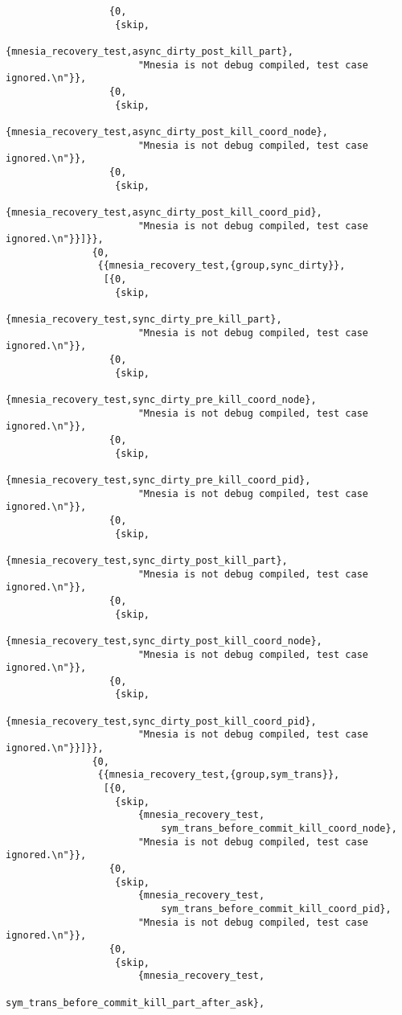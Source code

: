 \begin{verbatim}
                  {0,
                   {skip,
                       {mnesia_recovery_test,async_dirty_post_kill_part},
                       "Mnesia is not debug compiled, test case ignored.\n"}},
                  {0,
                   {skip,
                       {mnesia_recovery_test,async_dirty_post_kill_coord_node},
                       "Mnesia is not debug compiled, test case ignored.\n"}},
                  {0,
                   {skip,
                       {mnesia_recovery_test,async_dirty_post_kill_coord_pid},
                       "Mnesia is not debug compiled, test case ignored.\n"}}]}},
               {0,
                {{mnesia_recovery_test,{group,sync_dirty}},
                 [{0,
                   {skip,
                       {mnesia_recovery_test,sync_dirty_pre_kill_part},
                       "Mnesia is not debug compiled, test case ignored.\n"}},
                  {0,
                   {skip,
                       {mnesia_recovery_test,sync_dirty_pre_kill_coord_node},
                       "Mnesia is not debug compiled, test case ignored.\n"}},
                  {0,
                   {skip,
                       {mnesia_recovery_test,sync_dirty_pre_kill_coord_pid},
                       "Mnesia is not debug compiled, test case ignored.\n"}},
                  {0,
                   {skip,
                       {mnesia_recovery_test,sync_dirty_post_kill_part},
                       "Mnesia is not debug compiled, test case ignored.\n"}},
                  {0,
                   {skip,
                       {mnesia_recovery_test,sync_dirty_post_kill_coord_node},
                       "Mnesia is not debug compiled, test case ignored.\n"}},
                  {0,
                   {skip,
                       {mnesia_recovery_test,sync_dirty_post_kill_coord_pid},
                       "Mnesia is not debug compiled, test case ignored.\n"}}]}},
               {0,
                {{mnesia_recovery_test,{group,sym_trans}},
                 [{0,
                   {skip,
                       {mnesia_recovery_test,
                           sym_trans_before_commit_kill_coord_node},
                       "Mnesia is not debug compiled, test case ignored.\n"}},
                  {0,
                   {skip,
                       {mnesia_recovery_test,
                           sym_trans_before_commit_kill_coord_pid},
                       "Mnesia is not debug compiled, test case ignored.\n"}},
                  {0,
                   {skip,
                       {mnesia_recovery_test,
                           sym_trans_before_commit_kill_part_after_ask},

\end{verbatim}
